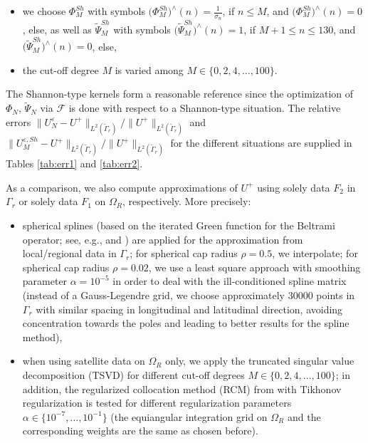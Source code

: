 \documentclass[a4paper, 10pt]{article}
\numberwithin{equation}{section}
\theoremstyle{definition}
\begin{document}
\begin{itemize}
 \item[(a)] we choose $\Phi_{M}^{Sh}$ with symbols $\big(\Phi_{M}^{Sh}\big)^\wedge(n)=\frac{1}{\sigma_n}$, if $n\leq M$, and $\big(\Phi_{M}^{Sh}\big)^\wedge(n)=0$, else, as well as $\tilde{\Psi}_{M}^{Sh}$ with symbols $\big(\tilde{\Psi}_{M}^{Sh}\big)^\wedge(n)=1$, if $M+1\leq n\leq 130$, and $\big(\tilde{\Psi}_{M}^{Sh}\big)^\wedge(n)=0$, else,
 \item[(b)] the cut-off degree $M$ is varied among $M\in\{0,2,4,\ldots,100\}$.
\end{itemize}
The Shannon-type kernels form a reasonable reference since the optimization of $\Phi_N$, $\tilde{\Psi}_N$ via $\mathcal{F}$ is done with respect to a Shannon-type situation. The relative errors $\|U_N^\varepsilon-U^+\|_{L^2(\tilde{\Gamma}_r)}/\|U^+\|_{L^2(\tilde{\Gamma}_r)}$ and $\|U_M^{\varepsilon,Sh}-U^+\|_{L^2(\tilde{\Gamma}_r)}/\|U^+\|_{L^2(\tilde{\Gamma}_r)}$ for the different situations are supplied in Tables \ref{tab:err1} and \ref{tab:err2}. 

As a comparison, we also compute approximations of $U^+$ using solely data $F_2$ in $\Gamma_r$ or solely data $F_1$ on $\Omega_R$, respectively. More precisely:
\begin{itemize}
 \item[(a)] spherical splines (based on the iterated Green function for the Beltrami operator; see, e.g., \cite{freeden81} and \cite{freeschrei09}) are applied for the approximation from local/regional data in $\Gamma_r$; for spherical cap radius $\rho=0.5$, we interpolate; for spherical cap radius $\rho=0.02$, we use a least square approach with smoothing parameter $\alpha=10^{-5}$ in order to deal with the ill-conditioned spline matrix (instead of a Gauss-Legendre grid, we choose approximately 30000 points in $\Gamma_r$ with similar spacing in longitudinal and latitudinal direction, avoiding concentration towards the poles and leading to better results for the spline method),
 \item[(b)] when using satellite data on $\Omega_R$ only, we apply the truncated singular value decomposition (TSVD) for different cut-off degrees $M\in\{0,2,4,\ldots,100\}$; in addition, the regularized collocation method (RCM) from \cite{naumov} with Tikhonov regularization is tested for different regularization parameters $\alpha\in\{10^{-7},\ldots,10^{-1}\}$ (the equiangular integration grid on $\Omega_R$ and the corresponding weights are the same as chosen before).
\end{itemize}
\end{document}
